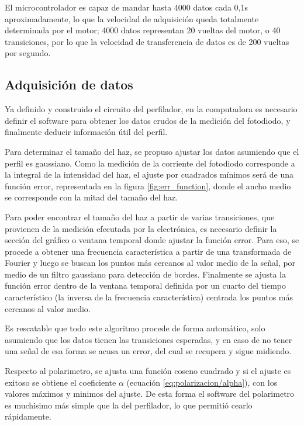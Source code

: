 El microcontrolador es capaz de mandar hasta 4000 datos cada 0,1s aproximadamente, lo que la velocidad de adquisición queda totalmente determinada por el motor; 4000 datos representan 20 vueltas del motor, o 40 transiciones, por lo que la velocidad de transferencia de datos es de 200 vueltas por segundo.

\subsection{Adquisición de datos}

Ya definido y construido el circuito del perfilador, en la computadora es necesario definir el software para obtener los datos crudos de la medición del fotodiodo, y finalmente deducir información útil del perfil. 

Para determinar el tamaño del haz, se propuso ajustar los datos asumiendo que el perfil es gaussiano. Como la medición de la corriente del fotodiodo corresponde a la integral de la intensidad del haz, el ajuste por cuadrados mínimos será de una función error, representada en la figura \ref{fig:err_function}, donde el ancho medio se corresponde con la mitad del tamaño del haz.

Para poder encontrar el tamaño del haz a partir de varias transiciones, que provienen de la medición efecutada por la electrónica, es necesario definir la sección del gráfico o ventana temporal donde ajustar la función error. Para eso, se procede a obtener una frecuencia característica a partir de una transformada de Fourier y luego se buscan los puntos más cercanos al valor medio de la señal, por medio de un filtro gaussiano para detección de bordes. Finalmente se ajusta la función error dentro de la ventana temporal definida por un cuarto del tiempo característico (la inversa de la frecuencia característica) centrada los puntos más cercanos al valor medio. 

Es rescatable que todo este algoritmo procede de forma automático, solo asumiendo que los datos tienen las transiciones esperadas, y en caso de no tener una señal de esa forma se acusa un error, del cual se recupera y sigue midiendo.

Respecto al polarimetro, se ajusta una función coseno cuadrado y si el ajuste es exitoso se obtiene el coeficiente $\alpha$ (ecuación \ref{eq:polarizacion/alpha}), con los valores máximos y minimos del ajuste. De esta forma el software del polarimetro es muchisimo más simple que la del perfilador, lo que permitió cearlo rápidamente.

